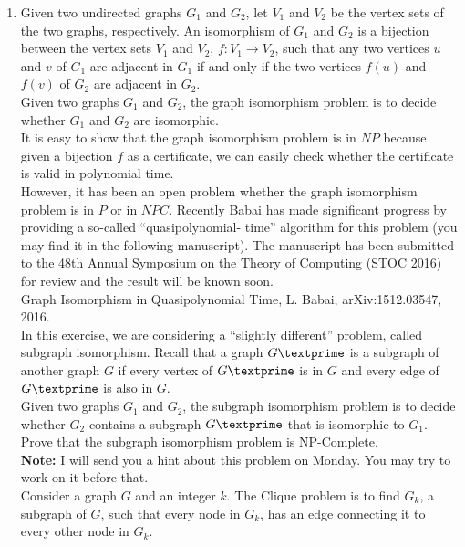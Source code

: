 \documentclass[paper=a4, fontsize=11pt]{scrartcl} %
\numberwithin{equation}{section} %
\numberwithin{figure}{section} %
\numberwithin{table}{section} %
\begin{document}
\begin{enumerate}
\item Given two undirected graphs $G_1$ and $G_2$, let $V_1$ and $V_2$ be the vertex sets of the two graphs, respectively. An isomorphism of $G_1$ and $G_2$ is a bijection between the vertex sets $V_1$ and $V_2$, $f : V_1 \rightarrow V_2$, such that any two vertices $u$ and $v$ of $G_1$ are adjacent in $G_1$ if and only if the two vertices $f(u)$ and $f(v)$ of $G_2$ are adjacent in $G_2$.\\
Given two graphs $G_1$ and $G_2$, the graph isomorphism problem is to decide whether $G_1$ and $G_2$ are isomorphic.\\
It is easy to show that the graph isomorphism problem is in $NP$ because given a bijection $f$ as a certificate, we can easily check whether the certificate is valid in polynomial time.\\
However, it has been an open problem whether the graph isomorphism problem is in $P$ or in $NPC$. Recently Babai has made significant progress by providing a so-called \enquote{quasipolynomial- time} algorithm for this problem (you may find it in the following manuscript). The manuscript has been submitted to the 48th Annual Symposium on the Theory of Computing (STOC 2016) for review and the result will be known soon.\\
Graph Isomorphism in Quasipolynomial Time, L. Babai, arXiv:1512.03547, 2016.\\
In this exercise, we are considering a \enquote{slightly different} problem, called subgraph isomorphism. Recall that a graph $G\textprime$ is a subgraph of another graph $G$ if every vertex of $G\textprime$ is in $G$ and every edge of $G\textprime$ is also in $G$.\\

Given two graphs $G_1$ and $G_2$, the subgraph isomorphism problem is to decide whether $G_2$ contains a subgraph $G\textprime$ that is isomorphic to $G_1$.\\

Prove that the subgraph isomorphism problem is NP-Complete.\\

\textbf{Note:} I will send you a hint about this problem on Monday. You may try to work on it before that.\\

Consider a graph $G$ and an integer $k$. The Clique problem is to find $G_k$, a subgraph of $G$, such that every node in $G_k$, has an edge connecting it to every other node in $G_k$.\\


\end{enumerate}
\end{document}
